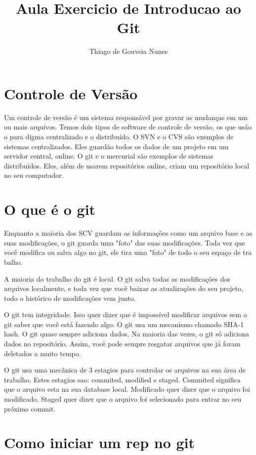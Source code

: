 \documentclass[12pt,onecolumn]{article}
\begin{document}
\title{Aula Exercicio de Introducao ao Git}
\author{Thiago de Gouveia Nunes}
\maketitle

\section{Controle de Versão}
    Um controle de versão é um sistema responsável por gravar as mudanças em um
    ou mais arquivos.
    Temos dois tipos de software de controle de versão, os que usão o para
    digma centralizado e o distribuído. O SVN e o CVS são exemplos de sistemas
    centralizados. Eles guardão todos os dados de um projeto em um servidor central,
    online. O git e o mercurial são exemplos de sistemas distribuidos. Eles, além
    de usarem repositórios online, criam um repositório local no seu computador.

\section{O que é o git}
    Enquanto a maioria dos SCV guardam as informações como um arquivo base e as suas
    modificações, o git guarda uma "foto" das suas modificações. Toda vez que você
    modifica ou salva algo no git, ele tira uma "foto" de todo o seu espaço de tra
    balho.
    
    A maioria do trabalho do git é local. O git salva todas as modificações dos arquivos
    localmente, e toda vez que você baixar as atualizações do seu projeto, todo o
    histórico de modificações vem junto.
    
    O git tem integridade. Isso quer dizer que é impossível modificar arquivos sem o
    git saber que você está fazendo algo. O git usa um mecanismo chamado SHA-1 hash.
    O git quase sempre adiciona dados. Na maioria das vezes, o git só adiciona dados
    no repositório. Assim, você pode sempre resgatar arquivos que já foram deletados
    a muito tempo.
    
    O git usa uma mecânica de 3 estagios para controlar os arquivos na sua área de
    trabalho. Estes estagios sao: commited, modified e staged. Commited significa
    que o arquivo esta na sua database local. Modificado quer dizer que o arquivo
    foi modificado. Staged quer dizer que o arquivo foi selecionado para entrar no seu
    próximo commit.

\section{Como iniciar um rep no git}
\end{document}
